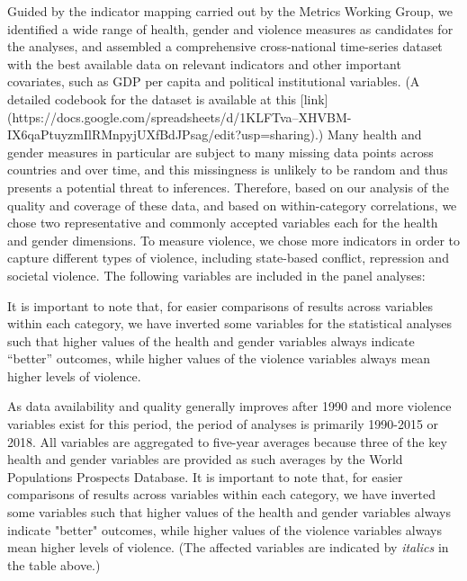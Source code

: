 \documentclass[12pt]{article}
\begin{document}
Guided by the indicator mapping carried out by the Metrics Working Group, we identified a wide range of health, gender and violence measures as candidates for the analyses, and assembled a comprehensive cross-national time-series dataset with the best available data on relevant indicators and other important covariates, such as GDP per capita and political institutional variables. (A detailed codebook for the dataset is available at this [link](https://docs.google.com/spreadsheets/d/1KLFTva--XHVBM-IX6qaPtuyzmIlRMnpyjUXfBdJPsag/edit?usp=sharing).) Many health and gender measures in particular are subject to many missing data points across countries and over time, and this missingness is unlikely to be random and thus presents a potential threat to inferences. Therefore, based on our analysis of the quality and coverage of these data, and based on within-category correlations, we chose two representative and commonly accepted variables each for the health and gender dimensions. To measure violence, we chose more indicators in order to capture different types of violence, including state-based conflict, repression and societal violence. The following variables are included in the panel analyses:

It is important to note that, for easier comparisons of results across variables within each category, we have inverted some variables for the statistical analyses such that higher values of the health and gender variables always indicate \enquote{better} outcomes, while higher values of the violence variables always mean higher levels of violence.



As data availability and quality generally improves after 1990 and more violence variables exist for this period, the period of analyses is primarily 1990-2015 or 2018. All variables are aggregated to five-year averages because three of the key health and gender variables are provided as such averages by the World Populations Prospects Database.
It is important to note that, for easier comparisons of results across variables within each category, we have inverted some variables such that higher values of the health and gender variables always indicate "better" outcomes, while higher values of the violence variables always mean higher levels of violence. (The affected variables are indicated by \textit{italics} in the table above.)

\end{document}
